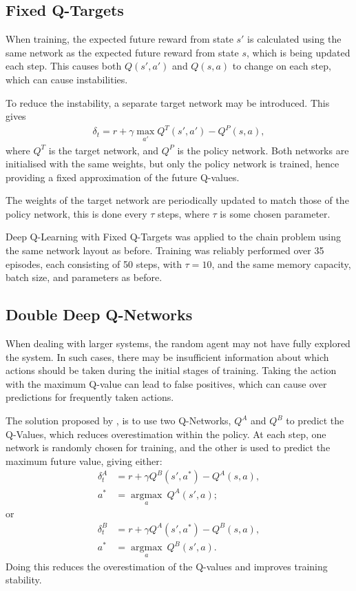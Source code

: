 \subsection{Fixed Q-Targets}

When training, the expected future reward from state $s'$ is calculated using
the same network as the expected future reward from state $s$, which is being
updated each step.
This causes both $Q(s',a')$ and $Q(s,a)$ to change on each step, which can cause
instabilities.

To reduce the instability, a separate target network may be introduced.
This gives
\begin{align*}
    \delta_t = r + \gamma\max_{a'}Q^T(s',a') - Q^P(s,a),
\end{align*}
where $Q^T$ is the target network, and $Q^P$ is the policy network.
Both networks are initialised with the same weights, but only the policy network
is trained, hence providing a fixed approximation of the future Q-values.

The weights of the target network are periodically updated to match those of the
policy network, this is done every $\tau$ steps, where $\tau$ is some chosen
parameter.

Deep Q-Learning with Fixed Q-Targets was applied to the chain problem using the
same network layout as before.
Training was reliably performed over 35 episodes, each consisting of 50 steps,
with $\tau = 10$, and the same memory capacity, batch size, and parameters as
before.



\subsection{Double Deep Q-Networks}

When dealing with larger systems, the random agent may not have fully explored
the system.
In such cases, there may be insufficient information about which actions should
be taken during the initial stages of training.
Taking the action with the maximum Q-value can lead to false positives, which
can cause over predictions for frequently taken actions.

The solution proposed by \cite{Hasselt:2010:Double}, is to use two Q-Networks,
$Q^A$ and $Q^B$ to predict the Q-Values, which reduces overestimation within the
policy.
At each step, one network is randomly chosen for training, and the other is used
to predict the maximum future value, giving either:
\begin{align*}
    \delta_t^A &= r + \gamma Q^B(s',a^*) - Q^A(s,a),\\
    a^* &= \underset{a}{\operatorname{argmax}}\ Q^A(s',a);
\end{align*}
or
\begin{align*}
    \delta_t^B &= r + \gamma Q^A(s',a^*) - Q^B(s,a),\\
    a^* &= \underset{a}{\operatorname{argmax}}\ Q^B(s',a).
\end{align*}
Doing this reduces the overestimation of the Q-values and improves training
stability.

